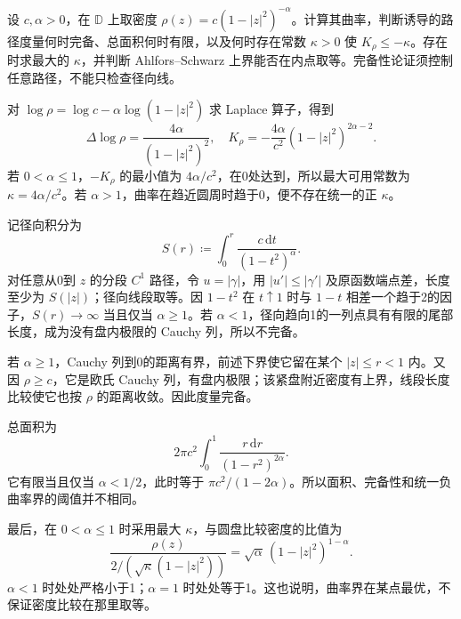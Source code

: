 \begin{exercise}[曲率、完备性与面积的不同阈值]\label{b3:ex:14-1}
设 \(c,\alpha>0\)，在 \(\mathbb D\) 上取密度 \(\rho(z)=c(1-|z|^2)^{-\alpha}\)。计算其曲率，判断诱导的路径度量何时完备、总面积何时有限，以及何时存在常数 \(\kappa>0\) 使 \(K_\rho\le-\kappa\)。存在时求最大的 \(\kappa\)，并判断 Ahlfors--Schwarz 上界能否在内点取等。完备性论证须控制任意路径，不能只检查径向线。
\end{exercise}
\begin{solution}
对 \(\log\rho=\log c-\alpha\log(1-|z|^2)\) 求 Laplace 算子，得到
\[
 \Delta\log\rho=\frac{4\alpha}{(1-|z|^2)^2},\quad
 K_\rho=-\frac{4\alpha}{c^2}(1-|z|^2)^{2\alpha-2}.
\]
若 \(0<\alpha\le1\)，\(-K_\rho\) 的最小值为 \(4\alpha/c^2\)，在0处达到，所以最大可用常数为 \(\kappa=4\alpha/c^2\)。若 \(\alpha>1\)，曲率在趋近圆周时趋于0，便不存在统一的正 \(\kappa\)。

记径向积分为
\[
 S(r)\coloneqq\int_0^r\frac{c\,\mathrm dt}{(1-t^2)^\alpha}.
\]
对任意从0到 \(z\) 的分段 \(C^1\) 路径，令 \(u=|\gamma|\)，用 \(|u'|\le|\gamma'|\) 及原函数端点差，长度至少为 \(S(|z|)\)；径向线段取等。因 \(1-t^2\) 在 \(t\uparrow1\) 时与 \(1-t\) 相差一个趋于2的因子，\(S(r)\rightarrow\infty\) 当且仅当 \(\alpha\ge1\)。若 \(\alpha<1\)，径向趋向1的一列点具有有限的尾部长度，成为没有盘内极限的 Cauchy 列，所以不完备。

若 \(\alpha\ge1\)，Cauchy 列到0的距离有界，前述下界使它留在某个 \(|z|\le r<1\) 内。又因 \(\rho\ge c\)，它是欧氏 Cauchy 列，有盘内极限；该紧盘附近密度有上界，线段长度比较使它也按 \(\rho\) 的距离收敛。因此度量完备。

总面积为
\[
 2\pi c^2\int_0^1\frac{r\,\mathrm dr}{(1-r^2)^{2\alpha}}.
\]
它有限当且仅当 \(\alpha<1/2\)，此时等于 \(\pi c^2/(1-2\alpha)\)。所以面积、完备性和统一负曲率界的阈值并不相同。

最后，在 \(0<\alpha\le1\) 时采用最大 \(\kappa\)，与圆盘比较密度的比值为
\[
 \frac{\rho(z)}{2/(\sqrt\kappa(1-|z|^2))}
 =\sqrt\alpha\,(1-|z|^2)^{1-\alpha}.
\]
\(\alpha<1\) 时处处严格小于1；\(\alpha=1\) 时处处等于1。这也说明，曲率界在某点最优，不保证密度比较在那里取等。
\end{solution}

